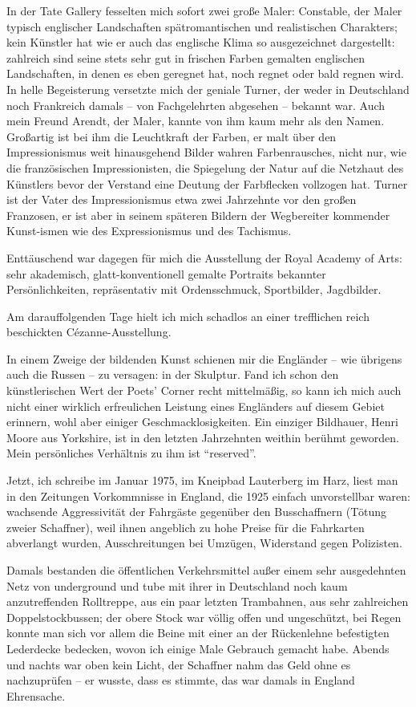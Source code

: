 \documentclass[a5paper,pagesize,10pt,twoside=true]{scrbook}
\renewcommand{\marginpar}[2][]{}
\begin{document}
In der Tate Gallery fesselten mich sofort zwei große Maler: Constable, der Maler typisch englischer Landschaften spätromantischen und realistischen Charakters; kein Künstler hat wie er auch das englische Klima so ausgezeichnet dargestellt: zahlreich sind seine stets sehr gut in frischen Farben gemalten englischen Landschaften, in denen es eben geregnet hat, noch regnet oder bald regnen wird. In helle Begeisterung versetzte mich der geniale Turner, der weder in Deutschland noch Frankreich damals -- von Fachgelehrten abgesehen -- bekannt war. Auch mein Freund Arendt, der Maler, kannte von ihm kaum mehr als den Namen. Großartig ist bei ihm die Leuchtkraft der Farben, er malt über den Impressionismus weit hinausgehend Bilder wahren Farbenrausches, nicht nur, wie die französischen Impressionisten, die Spiegelung der Natur auf die Netzhaut des Künstlers bevor der Verstand eine Deutung der Farbflecken vollzogen hat. Turner ist der Vater des Impressionismus etwa zwei Jahrzehnte vor den großen Franzosen, er ist aber in seinem späteren Bildern der Wegbereiter kommender Kunst-ismen wie des Expressionismus und des Tachismus.

Enttäuschend war dagegen für mich die Ausstellung der Royal Academy of Arts: sehr akademisch, glatt-konventionell gemalte Portraits bekannter Persönlichkeiten, repräsentativ mit Ordensschmuck, Sportbilder, Jagdbilder.

Am darauffolgenden Tage hielt ich mich schadlos an einer trefflichen reich beschickten Cézanne-Ausstellung.

In einem Zweige der bildenden Kunst schienen mir die Engländer -- wie übrigens auch die Russen -- zu versagen: in der Skulptur. Fand ich schon den künstlerischen Wert der Poets' Corner recht mittelmäßig, so kann ich mich auch nicht einer wirklich erfreulichen Leistung eines Engländers auf diesem Gebiet erinnern, wohl aber einiger Geschmacklosigkeiten. Ein einziger Bildhauer, Henri Moore aus Yorkshire, ist in den letzten Jahrzehnten weithin berühmt geworden. Mein persönliches Verhältnis zu ihm ist \enquote{reserved}.

\marginpar{501}
Jetzt, ich schreibe im Januar 1975, im Kneipbad Lauterberg im Harz, liest man in den Zeitungen Vorkommnisse in England, die 1925 einfach unvorstellbar waren: wachsende Aggressivität der Fahrgäste gegenüber den Busschaffnern (Tötung zweier Schaffner), weil ihnen angeblich zu hohe Preise für die Fahrkarten abverlangt wurden, Ausschreitungen bei Umzügen, Widerstand gegen Polizisten.

Damals bestanden die öffentlichen Verkehrsmittel außer einem sehr ausgedehnten Netz von underground und tube mit ihrer in Deutschland noch kaum anzutreffenden Rolltreppe, aus ein paar letzten Trambahnen, aus sehr zahlreichen Doppelstockbussen; der obere Stock war völlig offen und ungeschützt, bei Regen konnte man sich vor allem die Beine mit einer an der Rückenlehne befestigten Lederdecke bedecken, wovon ich einige Male Gebrauch gemacht habe. Abends und nachts war oben kein Licht, der Schaffner nahm das Geld ohne es nachzuprüfen -- er wusste, dass es stimmte, das war damals in England Ehrensache.
\end{document}
